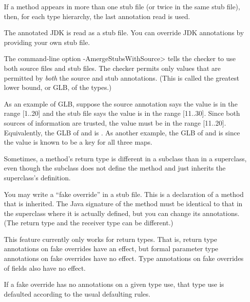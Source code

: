 If a method appears in more than one stub file (or twice in the same
stub file), then, for each type hierarchy, the last annotation read is used.

The annotated JDK is read as a stub file.
You can override JDK annotations by providing your own stub file.

The command-line option \<-AmergeStubsWithSource> tells the checker to use
both source files and stub files.  The checker permits only values that are
permitted by \emph{both} the source and stub annotations.  (This is called
the greatest lower bound, or GLB, of the types.)

As an example of GLB, suppose the source annotation says the value is in
the range [1..20] and the stub file says the value is in the range
[11..30].  Since both sources of information are trusted, the value must be
in the range [11..20].  Equivalently, the GLB of
 and
 is
.
As another example, the GLB of
 and
 is
since the value is known to be a key for all three maps.



Sometimes, a method's return type is different in a subclass than in a
superclass, even though the subclass does not define the method and just
inherits the superclass's definition.

You may write a ``fake override'' in a stub file.  This is a declaration of
a method that is inherited.  The Java signature of the method must be
identical to that in the superclass where it is actually defined, but you
can change its annotations.  (The return type and the receiver type can be
different.)

This feature currently only works for return types.  That is, return type
annotations on fake overrides have an effect, but formal parameter type
annotations on fake overrides have no effect.  Type annotations on fake
overrides of fields also have no effect.

If a fake override has no annotations on a given type use, that type use is
defaulted according to the usual defaulting rules.


